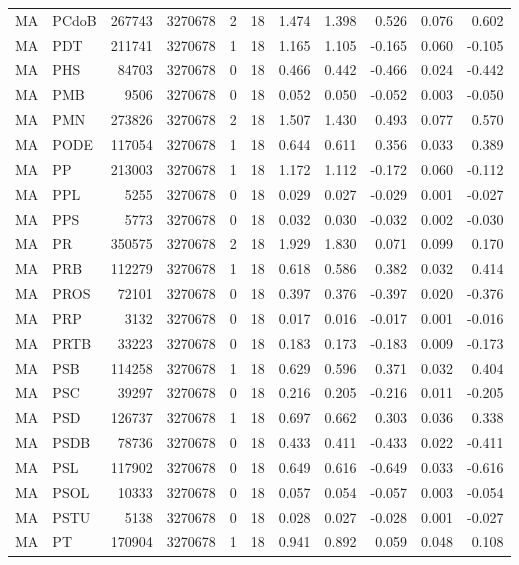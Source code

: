 \begin{landscape}
\begin{longtable}{llrrrrrrrrr}
MA & PCdoB & 267743 & 3270678 & 2 & 18 & 1.474 & 1.398 & 0.526 & 0.076 & 0.602 \\
MA & PDT & 211741 & 3270678 & 1 & 18 & 1.165 & 1.105 & -0.165 & 0.060 & -0.105 \\
MA & PHS & 84703 & 3270678 & 0 & 18 & 0.466 & 0.442 & -0.466 & 0.024 & -0.442 \\
MA & PMB & 9506 & 3270678 & 0 & 18 & 0.052 & 0.050 & -0.052 & 0.003 & -0.050 \\
MA & PMN & 273826 & 3270678 & 2 & 18 & 1.507 & 1.430 & 0.493 & 0.077 & 0.570 \\
MA & PODE & 117054 & 3270678 & 1 & 18 & 0.644 & 0.611 & 0.356 & 0.033 & 0.389 \\
MA & PP & 213003 & 3270678 & 1 & 18 & 1.172 & 1.112 & -0.172 & 0.060 & -0.112 \\
MA & PPL & 5255 & 3270678 & 0 & 18 & 0.029 & 0.027 & -0.029 & 0.001 & -0.027 \\
MA & PPS & 5773 & 3270678 & 0 & 18 & 0.032 & 0.030 & -0.032 & 0.002 & -0.030 \\
MA & PR & 350575 & 3270678 & 2 & 18 & 1.929 & 1.830 & 0.071 & 0.099 & 0.170 \\
MA & PRB & 112279 & 3270678 & 1 & 18 & 0.618 & 0.586 & 0.382 & 0.032 & 0.414 \\
MA & PROS & 72101 & 3270678 & 0 & 18 & 0.397 & 0.376 & -0.397 & 0.020 & -0.376 \\
MA & PRP & 3132 & 3270678 & 0 & 18 & 0.017 & 0.016 & -0.017 & 0.001 & -0.016 \\
MA & PRTB & 33223 & 3270678 & 0 & 18 & 0.183 & 0.173 & -0.183 & 0.009 & -0.173 \\
MA & PSB & 114258 & 3270678 & 1 & 18 & 0.629 & 0.596 & 0.371 & 0.032 & 0.404 \\
MA & PSC & 39297 & 3270678 & 0 & 18 & 0.216 & 0.205 & -0.216 & 0.011 & -0.205 \\
MA & PSD & 126737 & 3270678 & 1 & 18 & 0.697 & 0.662 & 0.303 & 0.036 & 0.338 \\
MA & PSDB & 78736 & 3270678 & 0 & 18 & 0.433 & 0.411 & -0.433 & 0.022 & -0.411 \\
MA & PSL & 117902 & 3270678 & 0 & 18 & 0.649 & 0.616 & -0.649 & 0.033 & -0.616 \\
MA & PSOL & 10333 & 3270678 & 0 & 18 & 0.057 & 0.054 & -0.057 & 0.003 & -0.054 \\
MA & PSTU & 5138 & 3270678 & 0 & 18 & 0.028 & 0.027 & -0.028 & 0.001 & -0.027 \\
MA & PT & 170904 & 3270678 & 1 & 18 & 0.941 & 0.892 & 0.059 & 0.048 & 0.108 \\

\end{longtable}
\end{landscape}
